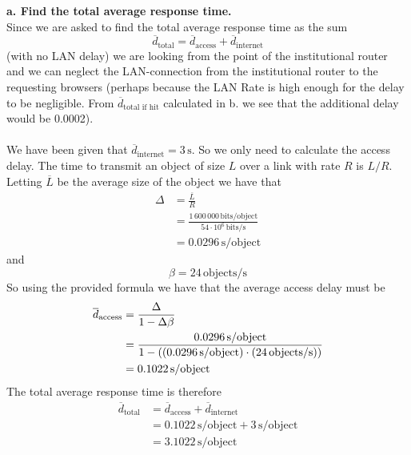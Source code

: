 \textbf{a. Find the total average response time.} \\
Since we are asked to find the total average response time as the sum
\begin{equation*}
    \overline{d}_\text{total} = \overline{d}_\text{access} + \overline{d}_\text{internet}
\end{equation*}
(with no LAN delay) we are looking from the point of the institutional router and we can neglect the LAN-connection from the institutional router to the requesting browsers (perhaps because the LAN Rate is high enough for the delay to be negligible. From $\overline{d}_\text{total if hit}$ calculated in b. we see that the additional delay would be 0.0002). \\
\\
We have been given that $\overline{d}_\text{internet} = 3 \, \text{s}$. So we only need to calculate the access delay. The time to transmit an object of size $L$ over a link with rate $R$ is $L/R$. Letting $\overline{L}$ be the average size of the object we have that
\begin{equation*}
\begin{split}
    \Delta &= \frac{\overline{L}}{R} \\
    &= \frac{1 \, 600 \, 000 \, \text{bits/object}}{54 \cdot 10^6 \, \text{bits/s}} \\
    &= 0.0296 \, \text{s/object}
\end{split} 
\end{equation*}
and
\begin{equation*}
    \beta = 24 \, \text{objects/s}
\end{equation*}
So using the provided formula we have that the average access delay must be 
\begin{equation*}
\begin{split}
    \overline{d}_\text{access} &= \frac{\Delta}{1 - \Delta \beta} \\
    &= \frac{0.0296 \, \text{s/object}}{1 - \left ( \left (0.0296 \, \text{s/object}\right) \cdot \left ( 24 \, \text{objects/s}\right)\right)} \\
    &= 0.1022 \, \text{s/object}
\end{split}
\end{equation*}
The total average response time is therefore
\begin{equation*}
\begin{split}
    \overline{d}_\text{total} &= \overline{d}_\text{access} + \overline{d}_\text{internet} \\
    &= 0.1022 \, \text{s/object} + 3 \, \text{s/object} \\
    &= 3.1022 \, \text{s/object}
\end{split}
\end{equation*}
